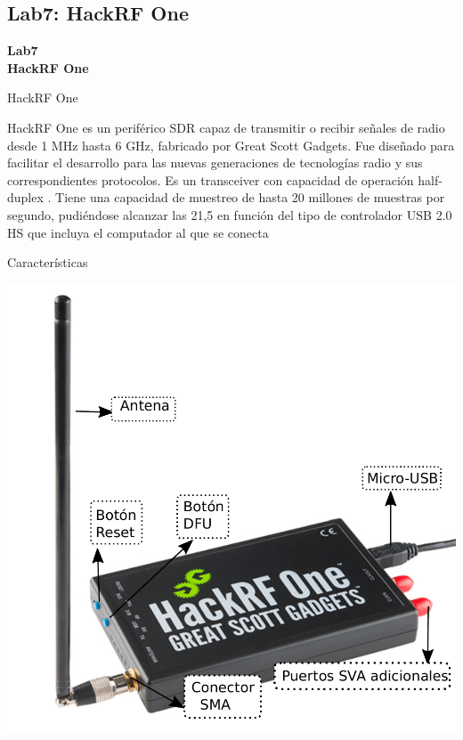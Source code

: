 \subsection{Lab7: HackRF One}
\begin{frame}{}


\bfseries{\textrm{\LARGE Lab7\\ \Large HackRF One}}
\raggedright
\end{frame}

\begin{frame}{HackRF One}



HackRF One es un periférico SDR capaz de transmitir o recibir señales de radio desde 1 MHz hasta 6 GHz, fabricado por Great Scott Gadgets. Fue diseñado para facilitar el  desarrollo para las nuevas generaciones de tecnologías radio y sus correspondientes protocolos. Es un transceiver con capacidad de operación half-duplex .  Tiene una capacidad de muestreo de hasta 20 millones de muestras por segundo, pudiéndose alcanzar las 21,5 en función del tipo de controlador USB 2.0 HS que incluya el computador al que se conecta

\end{frame}

\begin{frame}{Características}

\begin{center}
\vspace{-0.3cm}
\includegraphics[width=.7\textwidth]{parte2/lab7/pdf/lab7_1.pdf}
\end{center}

\end{frame}

